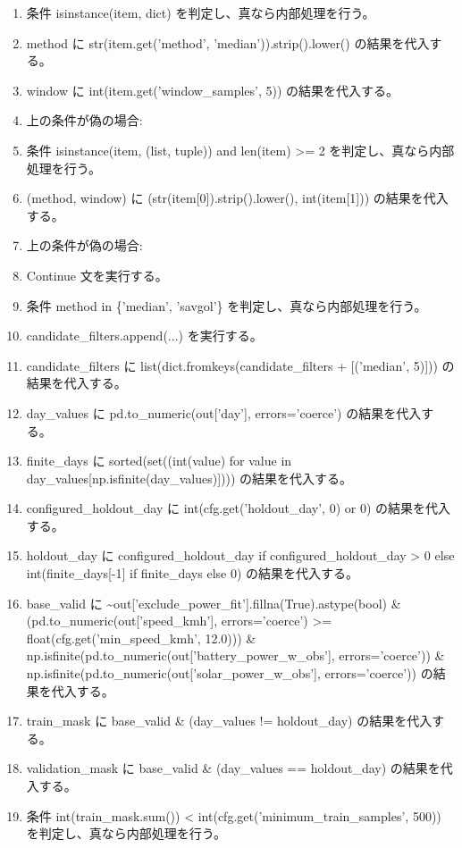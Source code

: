 \documentclass[a4paper,11pt]{article}
\begin{document}
\begin{enumerate}[leftmargin=1.8em]
\item   条件 isinstance(item, dict) を判定し、真なら内部処理を行う。
\item     method に str(item.get('method', 'median')).strip().lower() の結果を代入する。
\item     window に int(item.get('window\_samples', 5)) の結果を代入する。
\item     上の条件が偽の場合:
\item     条件 isinstance(item, (list, tuple)) and len(item) >= 2 を判定し、真なら内部処理を行う。
\item       (method, window) に (str(item[0]).strip().lower(), int(item[1])) の結果を代入する。
\item       上の条件が偽の場合:
\item       Continue 文を実行する。
\item   条件 method in \{'median', 'savgol'\} を判定し、真なら内部処理を行う。
\item     candidate\_filters.append(...) を実行する。
\item candidate\_filters に list(dict.fromkeys(candidate\_filters + [('median', 5)])) の結果を代入する。
\item day\_values に pd.to\_numeric(out['day'], errors='coerce') の結果を代入する。
\item finite\_days に sorted(set((int(value) for value in day\_values[np.isfinite(day\_values)]))) の結果を代入する。
\item configured\_holdout\_day に int(cfg.get('holdout\_day', 0) or 0) の結果を代入する。
\item holdout\_day に configured\_holdout\_day if configured\_holdout\_day > 0 else int(finite\_days[-1] if finite\_days else 0) の結果を代入する。
\item base\_valid に \textasciitilde{}out['exclude\_power\_fit'].fillna(True).astype(bool) \& (pd.to\_numeric(out['speed\_kmh'], errors='coerce') >= float(cfg.get('min\_speed\_kmh', 12.0))) \& np.isfinite(pd.to\_numeric(out['battery\_power\_w\_obs'], errors='coerce')) \& np.isfinite(pd.to\_numeric(out['solar\_power\_w\_obs'], errors='coerce')) の結果を代入する。
\item train\_mask に base\_valid \& (day\_values != holdout\_day) の結果を代入する。
\item validation\_mask に base\_valid \& (day\_values == holdout\_day) の結果を代入する。
\item 条件 int(train\_mask.sum()) < int(cfg.get('minimum\_train\_samples', 500)) を判定し、真なら内部処理を行う。

\end{enumerate}
\end{document}
